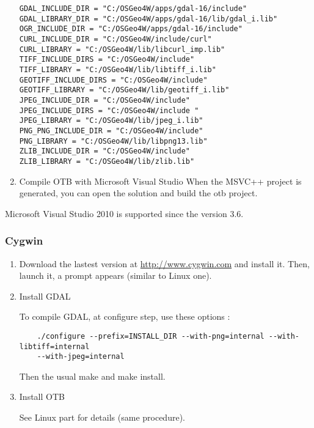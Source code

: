 \begin{enumerate}
        \texttt{GDAL\_INCLUDE\_DIR = "C:/OSGeo4W/apps/gdal-16/include"}\\
        \texttt{GDAL\_LIBRARY\_DIR = "C:/OSGeo4W/apps/gdal-16/lib/gdal\_i.lib"}\\
        \texttt{OGR\_INCLUDE\_DIR = "C:/OSGeo4W/apps/gdal-16/include"}\\
        \texttt{CURL\_INCLUDE\_DIR = "C:/OSGeo4W/include/curl"}\\
        \texttt{CURL\_LIBRARY = "C:/OSGeo4W/lib/libcurl\_imp.lib"}\\
        \texttt{TIFF\_INCLUDE\_DIRS = "C:/OSGeo4W/include"}\\
        \texttt{TIFF\_LIBRARY = "C:/OSGeo4W/lib/libtiff\_i.lib"}\\
        \texttt{GEOTIFF\_INCLUDE\_DIRS = "C:/OSGeo4W/include"}\\
        \texttt{GEOTIFF\_LIBRARY = "C:/OSGeo4W/lib/geotiff\_i.lib"}\\
        \texttt{JPEG\_INCLUDE\_DIR = "C:/OSGeo4W/include" }\\
        \texttt{JPEG\_INCLUDE\_DIRS = "C:/OSGeo4W/include "}\\
        \texttt{JPEG\_LIBRARY = "C:/OSGeo4W/lib/jpeg\_i.lib"}\\
        \texttt{PNG\_PNG\_INCLUDE\_DIR = "C:/OSGeo4W/include" }\\
        \texttt{PNG\_LIBRARY = "C:/OSGeo4W/lib/libpng13.lib"}\\
        \texttt{ZLIB\_INCLUDE\_DIR = "C:/OSGeo4W/include"}\\
        \texttt{ZLIB\_LIBRARY = "C:/OSGeo4W/lib/zlib.lib"}

\item Compile OTB with Microsoft Visual Studio
  When the MSVC++ project is generated, you can open the solution and build the otb project.

\end{enumerate}

Microsoft Visual Studio 2010 is supported since the version 3.6. 

\subsubsection{Cygwin}
\begin{enumerate}

\item Download the lastest version at \url{http://www.cygwin.com} and install it.
	Then, launch it, a prompt appears (similar to Linux one).

\item Install GDAL

	To compile GDAL, at configure step, use these options :
\begin{verbatim}
	./configure --prefix=INSTALL_DIR --with-png=internal --with-libtiff=internal
	--with-jpeg=internal
\end{verbatim}
	Then the usual make and make install.


\item Install OTB

	See Linux part for details (same procedure).
\end{enumerate}

